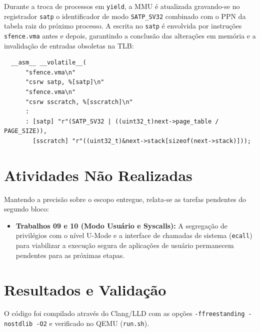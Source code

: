 \documentclass[12pt]{article}
\begin{document}
Durante a troca de processos em \texttt{yield}, a MMU é atualizada gravando-se no registrador \texttt{satp} o identificador de modo \texttt{SATP\_SV32} combinado com o PPN da tabela raiz do próximo processo. A escrita no \texttt{satp} é envolvida por instruções \texttt{sfence.vma} antes e depois, garantindo a conclusão das alterações em memória e a invalidação de entradas obsoletas na TLB:
\begin{verbatim}
  __asm__ __volatile__(
      "sfence.vma\n"
      "csrw satp, %[satp]\n"
      "sfence.vma\n"
      "csrw sscratch, %[sscratch]\n"
      :
      : [satp] "r"(SATP_SV32 | ((uint32_t)next->page_table / PAGE_SIZE)),
        [sscratch] "r"((uint32_t)&next->stack[sizeof(next->stack)]));
\end{verbatim}

\section{Atividades Não Realizadas}

Mantendo a precisão sobre o escopo entregue, relata-se as tarefas pendentes do segundo bloco:

\begin{itemize}
    \item \textbf{Trabalhos 09 e 10 (Modo Usuário e Syscalls):} A segregação de privilégios com o nível U-Mode e a interface de chamadas de sistema (\texttt{ecall}) para viabilizar a execução segura de aplicações de usuário permanecem pendentes para as próximas etapas.
\end{itemize}

\section{Resultados e Validação}

O código foi compilado através do Clang/LLD com as opções \texttt{-ffreestanding -nostdlib -O2} e verificado no QEMU (\texttt{run.sh}).
\end{document}
